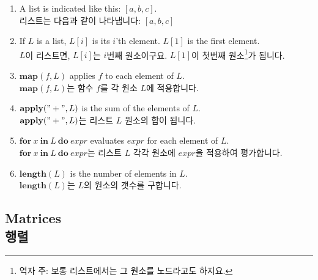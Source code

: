 \documentclass[12pt]{article}
\begin{document}
\begin{enumerate}

\item A list is indicated like this: $[a, b, c]$. \\
        리스트는 다음과 같이 나타냅니다: $[a, b, c]$

\item If $L$ is a list, $L[i]$ is its $i$'th element. $L[1]$ is the first element. \\
        $L$이 리스트면, $L[i]$는 $i$번째 원소이구요. $L[1]$이 첫번째 원소\footnote{역자 주: 보통 리스트에서는 그 원소를 노드라고도 하지요.}가 됩니다.

\item $\mathbf{map}(\mathit{f}, L)$ applies $\mathit{f}$ to each element of $L$. \\
        $\mathbf{map}(\mathit{f}, L)$는 함수 $\mathit{f}$를 각 원소 $L$에 적용합니다.

\item $\mathbf{apply}(\mathbf{"+"}, L)$ is the sum of the elements of $L$. \\
        $\mathbf{apply}(\mathbf{"+"}, L)$는 리스트 $L$ 원소의 합이 됩니다.

\item $\mathbf{for\ } x \mathbf{\ in \ } L \mathbf{\ do \ } \mathit{expr}$
    evaluates $\mathit{expr}$ for each element of $L$. \\
        $\mathbf{for\ } x \mathbf{\ in \ } L \mathbf{\ do \ } \mathit{expr}$는
     리스트 $L$ 각각 원소에 $\mathit{expr}$을 적용하여 평가합니다.

\item $\mathbf{length}(L)$ is the number of elements in $L$. \\
        $\mathbf{length}(L)$는 $L$의 원소의 갯수를 구합니다.

\end{enumerate}

\subsection{Matrices \\ 행렬}
\end{document}
